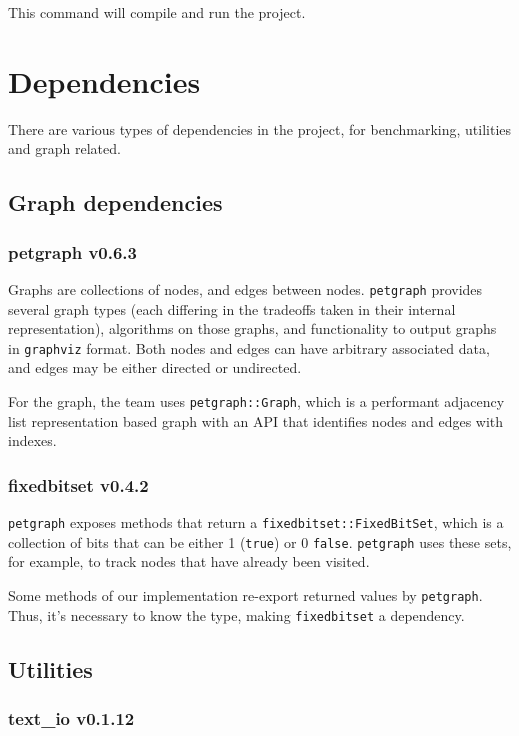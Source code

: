 This command will compile and run the project.


\newpage
\section{Dependencies}

There are various types of dependencies in the project, for benchmarking, utilities and graph related.

\subsection{Graph dependencies}

\subsubsection{petgraph v0.6.3}

Graphs are collections of nodes, and edges between nodes. \texttt{petgraph} provides several graph types
(each differing in the tradeoffs taken in their internal representation), algorithms on those graphs,
and functionality to output graphs in \texttt{graphviz} format. Both nodes and edges can have arbitrary associated data,
and edges may be either directed or undirected. \autocite{petgraph}

For the graph, the team uses \texttt{petgraph::Graph}, which is a performant adjacency list representation based graph
with an API that identifies nodes and edges with indexes.

\subsubsection{fixedbitset v0.4.2}

\texttt{petgraph} exposes methods that return a \texttt{fixedbitset::FixedBitSet}, which is a collection of bits that can be either 1 (\texttt{true})
or 0 \texttt{false}. \texttt{petgraph} uses these sets, for example, to track nodes that have already been visited.

Some methods of our implementation re-export returned values by \texttt{petgraph}. Thus, it's necessary to know the type, making
\texttt{fixedbitset} a dependency. \autocite{fixedbitset}


\subsection{Utilities}

\subsubsection{text\_io v0.1.12}

